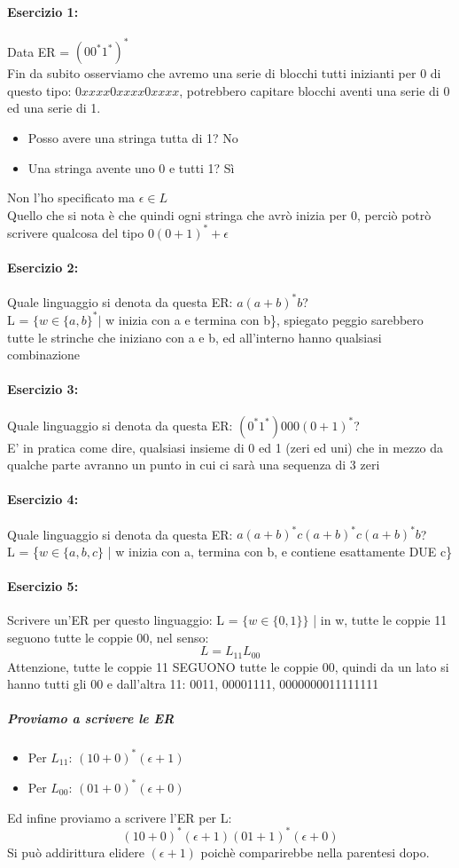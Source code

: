 \documentclass[12pt, a4paper, openany, oneside]{book}
\begin{document}
\paragraph{Esercizio 1: } Data ER = $(00^{*}1^{*})^{*}$\\ 
Fin da subito osserviamo che avremo una serie di blocchi tutti inizianti per
0 di questo tipo: $0xxxx0xxxx0xxxx$, potrebbero capitare blocchi aventi una
serie di 0 ed una serie di 1. 
\begin{itemize}
	\item Posso avere una stringa tutta di 1? No
	\item Una stringa avente uno 0 e tutti 1? Sì
\end{itemize}
Non l'ho specificato ma $\epsilon \in L$ \\
Quello che si nota è che quindi ogni stringa che avrò inizia per 0, perciò potrò
scrivere qualcosa del tipo $0(0+1)^{*} + \epsilon$
\paragraph{Esercizio 2: } Quale linguaggio si denota da questa ER: $a(a+b)^{*}b$?\\
L = $\{w \in \{a,b\}^{*} |$ w inizia con a e termina con b\}, spiegato peggio 
sarebbero tutte le strinche che iniziano con a e b, ed all'interno hanno 
qualsiasi combinazione
\paragraph{Esercizio 3: } Quale linguaggio si denota da questa ER: $(0^{*}1^{*})000(0+1)^{*}$?\\
E' in pratica come dire, qualsiasi insieme di 0 ed 1 (zeri ed uni) che in mezzo
da qualche parte avranno un punto in cui ci sarà una sequenza di 3 zeri
\paragraph{Esercizio 4: } Quale linguaggio si denota da questa ER: $a(a+b)^{*}c(a+b)^{*}c(a+b)^{*}b$?\\
L = \{$w\in \{a,b,c\}$ | w inizia con a, termina con b, e contiene esattamente DUE c\}
\paragraph{Esercizio 5: } Scrivere un'ER per questo linguaggio: 
L = $\{w\in \{0,1\}\}$ | in w, tutte le coppie 11 seguono tutte le coppie 00, 
nel senso:
\[
L = L_{11}L_{00} 
\]
Attenzione, tutte le coppie 11 SEGUONO tutte le coppie 00, quindi da un lato
si hanno tutti gli 00 e dall'altra 11: 0011, 00001111, 0000000011111111 
\subparagraph{Proviamo a scrivere le ER } 
\begin{itemize}
	\item Per $L_{11}$: $(10+0)^{*}(\epsilon + 1)$
	\item Per $L_{00}$: $(01+0)^{*}(\epsilon + 0)$
\end{itemize}
Ed infine proviamo a scrivere l'ER per L:
\[
(10+0)^{*} (\epsilon + 1) (01+1)^{*} (\epsilon + 0)
\]
Si può addirittura elidere $(\epsilon + 1)$ poichè comparirebbe nella parentesi
dopo.
\end{document}
